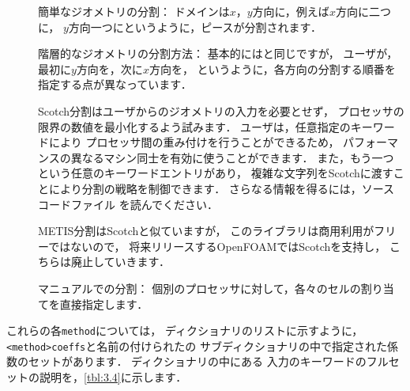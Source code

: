 \begin{description}
 \item[]
%
%
            簡単なジオメトリの分割：
            ドメインは$x$，$y$方向に，例えば$x$方向に二つに，
            $y$方向一つにというように，ピースが分割されます．
 \item[]
%
%
            階層的なジオメトリの分割方法：
            基本的にはと同じですが，
            ユーザが，最初に$y$方向を，次に$x$方向を，
            というように，各方向の分割する順番を指定する点が異なっています．
 \item[]
            Scotch分割はユーザからのジオメトリの入力を必要とせず，
            プロセッサの限界の数値を最小化するよう試みます．
            ユーザは，任意指定のキーワードにより
            プロセッサ間の重み付けを行うことができるため，
            パフォーマンスの異なるマシン同士を有効に使うことができます．
            また，もう一つという任意のキーワードエントリがあり，
            複雑な文字列をScotchに渡すことにより分割の戦略を制御できます．
            さらなる情報を得るには，ソースコードファイル
            を読んでください．
 \item[]
%
%
            METIS分割はScotchと似ていますが，
            このライブラリは商用利用がフリーではないので，
            将来リリースするOpenFOAMではScotchを支持し，
            こちらは廃止していきます．
 \item[]
%
%
            マニュアルでの分割：
            個別のプロセッサに対して，各々のセルの割り当てを直接指定します．
\end{description}
これらの各\verb|method|については，
ディクショナリのリストに示すように，
\verb|<method>coeffs|と名前の付けられたの
サブディクショナリの中で指定された係数のセットがあります．
ディクショナリの中にある
入力のキーワードのフルセットの説明を，\autoref{tbl:3.4}に示します．


